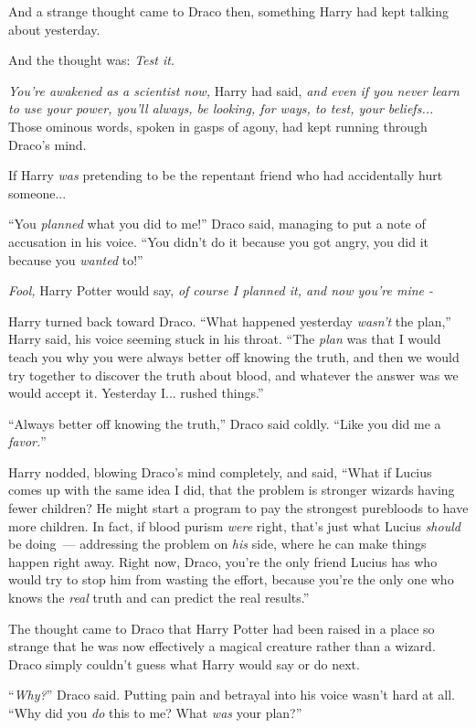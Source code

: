 And a strange thought came to Draco then, something Harry had kept talking about yesterday.

And the thought was: \emph{Test it.}

\emph{You're awakened as a scientist now,} Harry had said, \emph{and even if you never learn to use your power, you'll always, be looking, for ways, to test, your beliefs...} Those ominous words, spoken in gasps of agony, had kept running through Draco's mind.

If Harry \emph{was} pretending to be the repentant friend who had accidentally hurt someone...

``You \emph{planned} what you did to me!'' Draco said, managing to put a note of accusation in his voice. ``You didn't do it because you got angry, you did it because you \emph{wanted} to!''

\emph{Fool,} Harry Potter would say, \emph{of course I planned it, and now you're mine -}

Harry turned back toward Draco. ``What happened yesterday \emph{wasn't} the plan,'' Harry said, his voice seeming stuck in his throat. ``The \emph{plan} was that I would teach you why you were always better off knowing the truth, and then we would try together to discover the truth about blood, and whatever the answer was we would accept it. Yesterday I... rushed things.''

``Always better off knowing the truth,'' Draco said coldly. ``Like you did me a \emph{favor.}''

Harry nodded, blowing Draco's mind completely, and said, ``What if Lucius comes up with the same idea I did, that the problem is stronger wizards having fewer children? He might start a program to pay the strongest purebloods to have more children. In fact, if blood purism \emph{were} right, that's just what Lucius \emph{should} be doing~--- addressing the problem on \emph{his} side, where he can make things happen right away. Right now, Draco, you're the only friend Lucius has who would try to stop him from wasting the effort, because you're the only one who knows the \emph{real} truth and can predict the real results.''

The thought came to Draco that Harry Potter had been raised in a place so strange that he was now effectively a magical creature rather than a wizard. Draco simply couldn't guess what Harry would say or do next.

``\emph{Why?}'' Draco said. Putting pain and betrayal into his voice wasn't hard at all. ``Why did you \emph{do} this to me? What \emph{was} your plan?''

